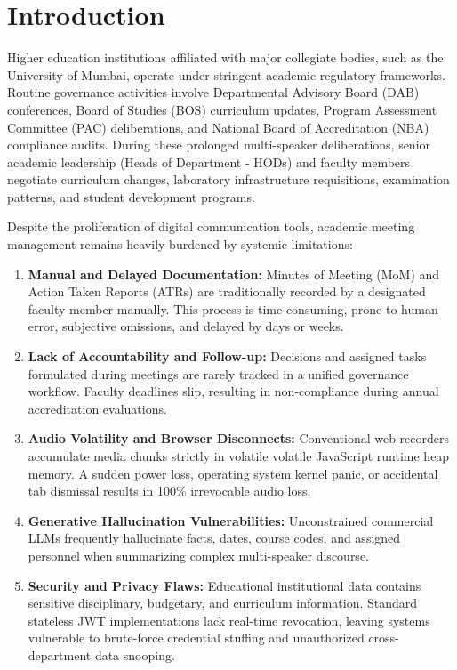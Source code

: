 \documentclass[conference]{IEEEtran}
\begin{document}
\section{Introduction}
Higher education institutions affiliated with major collegiate bodies, such as the University of Mumbai, operate under stringent academic regulatory frameworks. Routine governance activities involve Departmental Advisory Board (DAB) conferences, Board of Studies (BOS) curriculum updates, Program Assessment Committee (PAC) deliberations, and National Board of Accreditation (NBA) compliance audits. During these prolonged multi-speaker deliberations, senior academic leadership (Heads of Department - HODs) and faculty members negotiate curriculum changes, laboratory infrastructure requisitions, examination patterns, and student development programs.

Despite the proliferation of digital communication tools, academic meeting management remains heavily burdened by systemic limitations:
\begin{enumerate}
    \item \textbf{Manual and Delayed Documentation:} Minutes of Meeting (MoM) and Action Taken Reports (ATRs) are traditionally recorded by a designated faculty member manually. This process is time-consuming, prone to human error, subjective omissions, and delayed by days or weeks.
    \item \textbf{Lack of Accountability and Follow-up:} Decisions and assigned tasks formulated during meetings are rarely tracked in a unified governance workflow. Faculty deadlines slip, resulting in non-compliance during annual accreditation evaluations.
    \item \textbf{Audio Volatility and Browser Disconnects:} Conventional web recorders accumulate media chunks strictly in volatile volatile JavaScript runtime heap memory. A sudden power loss, operating system kernel panic, or accidental tab dismissal results in 100\% irrevocable audio loss.
    \item \textbf{Generative Hallucination Vulnerabilities:} Unconstrained commercial LLMs frequently hallucinate facts, dates, course codes, and assigned personnel when summarizing complex multi-speaker discourse.
    \item \textbf{Security and Privacy Flaws:} Educational institutional data contains sensitive disciplinary, budgetary, and curriculum information. Standard stateless JWT implementations lack real-time revocation, leaving systems vulnerable to brute-force credential stuffing and unauthorized cross-department data snooping.
\end{enumerate}
\end{document}
